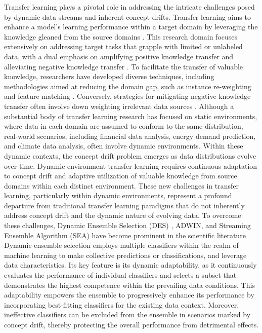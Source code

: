 Transfer learning plays a pivotal role in addressing the intricate challenges posed by dynamic data streams and inherent concept drifts. Transfer learning aims to enhance a model's learning performance within a target domain by leveraging the knowledge gleaned from the source domains \cite{pan2009survey}\cite{wang2019characterizing}. This research domain focuses extensively on addressing target tasks that grapple with limited or unlabeled data, with a dual emphasis on amplifying positive knowledge transfer and alleviating negative knowledge transfer \cite{wang2019characterizing}. To facilitate the transfer of valuable knowledge, researchers have developed diverse techniques, including methodologies aimed at reducing the domain gap, such as instance re-weighting \cite{zadrozny2004learning}\cite{cortes2008sample}\cite{pan2010domain} and feature matching \cite{sun2016return}\cite{pan2010domain}. Conversely, strategies for mitigating negative knowledge transfer often involve down weighting irrelevant data sources \cite{wang2019characterizing}.
Although a substantial body of transfer learning research has focused on static environments, where data in each domain are assumed to conform to the same distribution, real-world scenarios, including financial data analysis, energy demand prediction, and climate data analysis, often involve dynamic environments. Within these dynamic contexts, the concept drift problem \cite{li2015learning}\cite{cao2019learning} emerges as data distributions evolve over time. Dynamic environment transfer learning requires continuous adaptation to concept drift and adaptive utilization of valuable knowledge from source domains within each distinct environment. These new challenges in transfer learning, particularly within dynamic environments, represent a profound departure from traditional transfer learning paradigms that do not inherently address concept drift and the dynamic nature of evolving data.
To overcome these challenges, Dynamic Ensemble Selection (DES) \cite{cruz2017meta}\cite{jackowski2014improved}\cite{kuncheva2000clustering}, ADWIN, and Streaming Ensemble Algorithm (SEA) have become prominent in the scientific literature \cite{gama2004learning}\cite{adams2023explainable}\cite{madkour2023historical} Dynamic ensemble selection employs multiple classifiers within the realm of machine learning to make collective predictions or classifications, and leverage data characteristics. Its key feature is its dynamic adaptability, as it continuously evaluates the performance of individual classifiers and selects a subset that demonstrates the highest competence within the prevailing data conditions. This adaptability empowers the ensemble to progressively enhance its performance by incorporating best-fitting classifiers for the existing data context. Moreover, ineffective classifiers can be excluded from the ensemble in scenarios marked by concept drift, thereby protecting the overall performance from detrimental effects.
